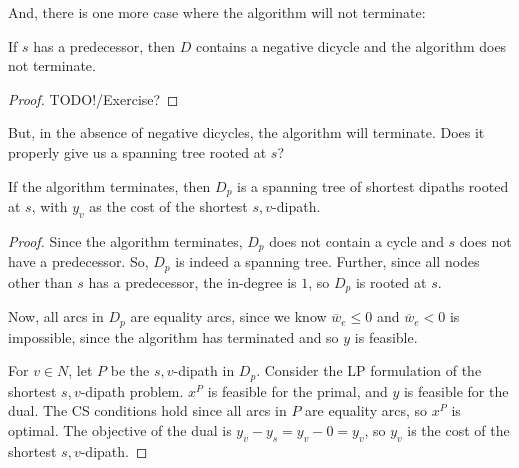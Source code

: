 And, there is one more case where the algorithm will not terminate:
\begin{proposition}{}{}
    If $s$ has a predecessor, then $D$ contains a negative dicycle and the algorithm does not terminate.
\end{proposition}
\begin{proof}
    TODO!/Exercise?
\end{proof}

But, in the absence of negative dicycles, the algorithm will terminate. Does it properly give us a spanning tree rooted at $s$?
\begin{proposition}{}{}
    If the algorithm terminates, then $D_p$ is a spanning tree of shortest dipaths rooted at $s$, with $y_v$ as the cost of the shortest $s,v$-dipath.
\end{proposition}
\begin{proof}
    Since the algorithm terminates, $D_p$ does not contain a cycle and $s$ does not have a predecessor. So, $D_p$ is indeed a spanning tree. Further, since all nodes other than $s$ has a predecessor, the in-degree is $1$, so $D_p$ is rooted at $s$.

    Now, all arcs in $D_p$ are equality arcs, since we know $\overline{w}_e \leq 0$ and $\overline{w}_e < 0$ is impossible, since the algorithm has terminated and so $y$ is feasible. 

    For $v \in N$, let $P$ be the $s,v$-dipath in $D_p$. Consider the LP formulation of the shortest $s,v$-dipath problem. $x^P$ is feasible for the primal, and $y$ is feasible for the dual. The CS conditions hold since all arcs in $P$ are equality arcs, so $x^P$ is optimal. The objective of the dual is $y_v - y_s = y_v - 0 = y_v$, so $y_v$ is the cost of the shortest $s,v$-dipath.
\end{proof}
